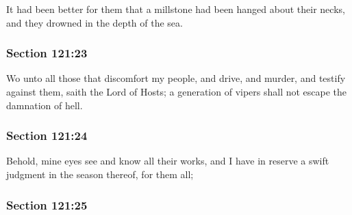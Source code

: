 		It had been better for them that a millstone had been hanged about their necks, and they drowned in the depth of the sea.


	\subsubsection{Section 121:23} %
		\label{DC121-23}

		Wo unto all those that discomfort my people, and drive, and murder, and testify against them, saith the Lord of Hosts; a generation of vipers shall not escape the damnation of hell.


	\subsubsection{Section 121:24} %
		\label{DC121-24}

		Behold, mine eyes see and know all their works, and I have in reserve a swift judgment in the season thereof, for them all;


	\subsubsection{Section 121:25} %
		\label{DC121-25}

